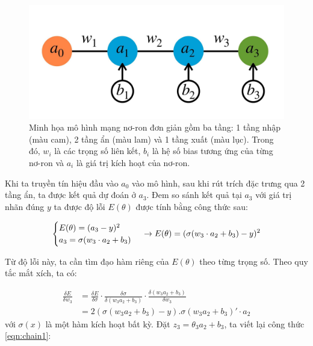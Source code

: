 \begin{figure}[htp]
	\centering
	\includegraphics[width=140 mm]{images/wandb.jpg}
	\caption{Minh họa mô hình mạng nơ-ron đơn giản gồm ba tầng: 1 tầng nhập (màu cam), 2 tầng ẩn (màu lam) và 1 tầng xuất (màu lục). Trong đó, $w_i$ là các trọng số liên kết, $b_i$ là hệ số bias tương ứng của từng nơ-ron và $a_i$ là giá trị kích hoạt của nơ-ron.}
	\label{fig:wandb}
\end{figure}

Khi ta truyền tín hiệu đầu vào $a_0$ vào mô hình, sau khi rút trích đặc trưng qua 2 tầng ẩn, ta được kết quả dự đoán ở $a_3$. Đem so sánh kết quả tại $a_3$ với giá trị nhãn đúng $y$ ta được độ lỗi $E(\theta)$ được tính bằng công thức sau:

\begin{equation}
	\begin{cases}
		E(\theta) = (a_3 - y)^2 \\
		a_3 = \sigma(w_3\cdot a_2 + b_3)
	\end{cases} \\
	\rightarrow E(\theta) = (\sigma(w_3\cdot a_2 + b_3) - y)^2
\end{equation}

Từ độ lỗi này, ta cần tìm đạo hàm riêng của $E(\theta)$ theo từng trọng số. Theo quy tắc mắt xích, ta có:

\begin{equation}
	\label{eqn:chain1}
	\begin{split}
		\frac{\delta E}{\delta w_3} &= \frac{\delta E}{\delta \sigma}\cdot\frac{\delta \sigma}{\delta (w_3a_2 + b_3)}\cdot \frac{\delta(w_3a_2 + b_3)}{\delta w_3} \\ &= 2(\sigma(w_3a_2+b_3)-y). \sigma(w_3a_2 + b_3)'\cdot a_2
	\end{split}
\end{equation}
với $\sigma(x)$ là một hàm kích hoạt bất kỳ. Đặt $z_3 = \theta_3a_2 + b_3$, ta viết lại công thức \ref{eqn:chain1}:

